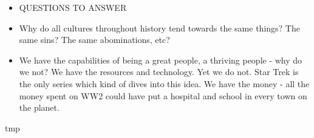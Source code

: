 \documentclass[10pt]{article}
\begin{document}
\begin{multicols}{2}
\begin{itemize}
\item QUESTIONS TO ANSWER
\item Why do all cultures throughout history tend towards the same things? The same sins? The same abominations, etc?
\item We have the capabilities of being a great people, a thriving people - why do we not? We have the resources and technology. Yet we do not. Star Trek is the only series which kind of dives into this idea. We have the money - all the money spent on WW2 could have put a hospital and school in every town on the planet.
\end{itemize}


\begin{thebibliography}{9}
	{\footnotesize
		
	 tmp
	
	}
\end{thebibliography}

\end{multicols}


\end{document}
